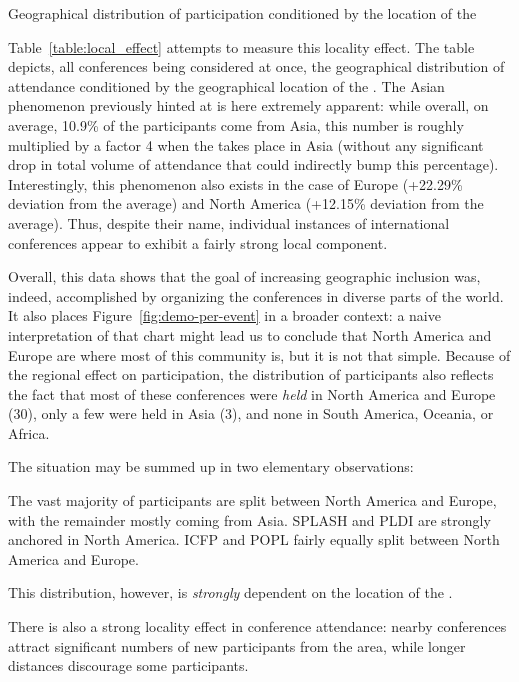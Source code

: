 \begin{table}
\caption{Geographical distribution of participation conditioned by the
  location of the \event{}}
\label{table:local_effect}
\end{table}

Table~\ref{table:local_effect} attempts to measure this locality effect. The
table depicts, all conferences being considered at once, the geographical
distribution of attendance conditioned by the geographical location of the
\event. The Asian phenomenon previously hinted at is here extremely
apparent: while overall, on average, 10.9\% of the participants come from Asia,
this number is roughly multiplied by a factor 4 when the \event takes place
in Asia (without any significant drop in total volume of attendance that
could indirectly bump this percentage).
Interestingly, this phenomenon also exists in the case of Europe (+22.29\%
deviation from the average) and North America (+12.15\% deviation from the
average).
Thus, despite their name, individual instances of international conferences
appear to exhibit a fairly strong local component.

Overall, this data shows that the goal of increasing geographic inclusion was,
indeed, accomplished by organizing the conferences in diverse parts
of the world. It also places Figure~\ref{fig:demo-per-event} in a broader
context:
a naive interpretation of that chart might lead us to conclude that North
America and Europe are where most of this community is, but it is not that
simple. Because of the regional effect on participation, the distribution of
participants also reflects the fact that most of these conferences were {\em
  held} in
North America and Europe (30), only a few were held in Asia (3), and none in
South America, Oceania, or Africa.

The situation may be summed up in two elementary observations:
\begin{obs}
  The vast majority of participants are split between North America and
  Europe, with the remainder mostly coming from
  Asia. SPLASH and PLDI are strongly anchored in North
  America. ICFP and POPL fairly equally split between North America and Europe.
  \label{obs:dist-naive}
\end{obs}
This distribution, however, is \emph{strongly} dependent on the
location of the \event.
\begin{obs}
  There is also a strong locality effect in conference attendance: nearby
  conferences attract significant numbers of new participants from the area,
  while longer distances discourage some participants.
  \label{obs:locality}
\end{obs}

